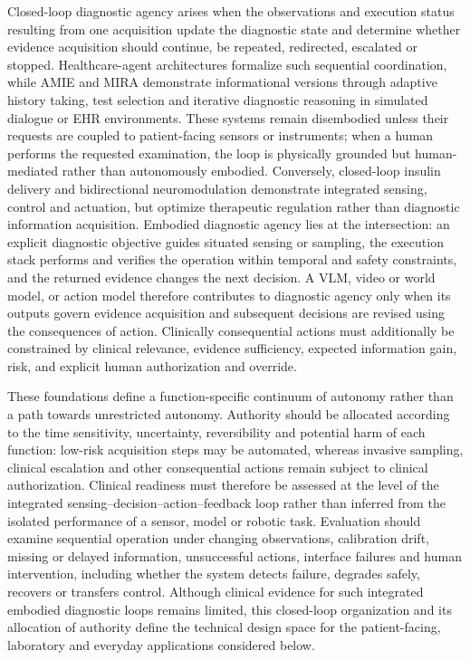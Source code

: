 \documentclass[12pt,a4paper]{article}
\begin{document}
Closed-loop diagnostic agency arises when the observations and execution status resulting from one acquisition update the diagnostic state and determine whether evidence acquisition should continue, be repeated, redirected, escalated or stopped. Healthcare-agent architectures formalize such sequential coordination, while AMIE and MIRA demonstrate informational versions through adaptive history taking, test selection and iterative diagnostic reasoning in simulated dialogue or EHR environments. These systems remain disembodied unless their requests are coupled to patient-facing sensors or instruments; when a human performs the requested examination, the loop is physically grounded but human-mediated rather than autonomously embodied. Conversely, closed-loop insulin delivery and bidirectional neuromodulation demonstrate integrated sensing, control and actuation, but optimize therapeutic regulation rather than diagnostic information acquisition. Embodied diagnostic agency lies at the intersection: an explicit diagnostic objective guides situated sensing or sampling, the execution stack performs and verifies the operation within temporal and safety constraints, and the returned evidence changes the next decision. A VLM, video or world model, or action model therefore contributes to diagnostic agency only when its outputs govern evidence acquisition and subsequent decisions are revised using the consequences of action. Clinically consequential actions must additionally be constrained by clinical relevance, evidence sufficiency, expected information gain, risk, and explicit human authorization and override.

These foundations define a function-specific continuum of autonomy rather than a path towards unrestricted autonomy. Authority should be allocated according to the time sensitivity, uncertainty, reversibility and potential harm of each function: low-risk acquisition steps may be automated, whereas invasive sampling, clinical escalation and other consequential actions remain subject to clinical authorization. Clinical readiness must therefore be assessed at the level of the integrated sensing--decision--action--feedback loop rather than inferred from the isolated performance of a sensor, model or robotic task. Evaluation should examine sequential operation under changing observations, calibration drift, missing or delayed information, unsuccessful actions, interface failures and human intervention, including whether the system detects failure, degrades safely, recovers or transfers control. Although clinical evidence for such integrated embodied diagnostic loops remains limited, this closed-loop organization and its allocation of authority define the technical design space for the patient-facing, laboratory and everyday applications considered below.
\end{document}
